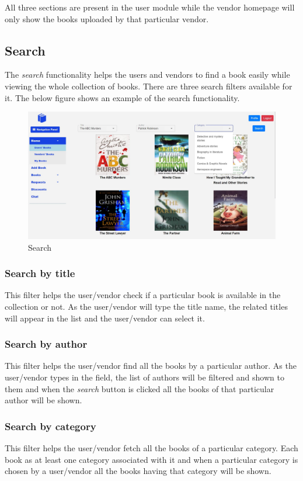 \documentclass[conference]{IEEEtran}
\begin{document}
All three sections are present in the user module while the vendor homepage will only show the books uploaded by that particular vendor.

\subsection{Search}
The \emph{search} functionality helps the users and vendors to find a book easily while viewing the whole collection of books. There are three search filters available for it. The below figure shows an example of the search functionality.
\begin{figure}[ht]
     \centering
     \includegraphics[scale=0.21,margin=2,frame]{search.jpg}
     \caption{Search}
     \label{fig:search}
 \end{figure}
\subsubsection{Search by title}
This filter helps the user/vendor check if a particular book is available in the collection or not. As the user/vendor will type the title name, the related titles will appear in the list and the user/vendor can select it.
\subsubsection{Search by author}
This filter helps the user/vendor find all the books by a particular author. As the user/vendor types in the field, the list of authors will be filtered and shown to them and when the \emph{search} button is clicked all the books of that particular author will be shown.
\subsubsection{Search by category}
This filter helps the user/vendor fetch all the books of a particular category. Each book as at least one category associated with it and when a particular category is chosen by a user/vendor all the books having that category will be shown.
\end{document}
